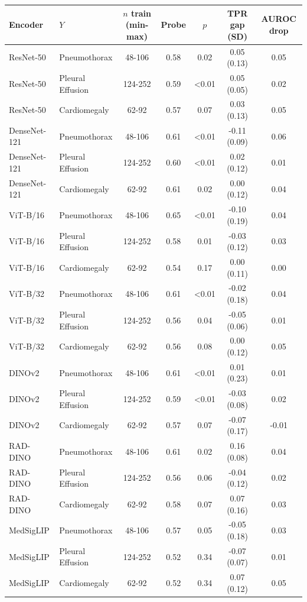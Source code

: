 \begin{tabular}{llccccc}
\toprule
Encoder & $Y$ & $n$ train (min-max) & Probe & $p$ & TPR gap (SD) & AUROC drop \\
\midrule
ResNet-50 & Pneumothorax & 48-106 & 0.58 & 0.02 & 0.05 (0.13) & 0.05 \\
ResNet-50 & Pleural Effusion & 124-252 & 0.59 & <0.01 & 0.05 (0.05) & 0.02 \\
ResNet-50 & Cardiomegaly & 62-92 & 0.57 & 0.07 & 0.03 (0.13) & 0.05 \\
DenseNet-121 & Pneumothorax & 48-106 & 0.61 & <0.01 & -0.11 (0.09) & 0.06 \\
DenseNet-121 & Pleural Effusion & 124-252 & 0.60 & <0.01 & 0.02 (0.12) & 0.01 \\
DenseNet-121 & Cardiomegaly & 62-92 & 0.61 & 0.02 & 0.00 (0.12) & 0.04 \\
ViT-B/16 & Pneumothorax & 48-106 & 0.65 & <0.01 & -0.10 (0.19) & 0.04 \\
ViT-B/16 & Pleural Effusion & 124-252 & 0.58 & 0.01 & -0.03 (0.12) & 0.03 \\
ViT-B/16 & Cardiomegaly & 62-92 & 0.54 & 0.17 & 0.00 (0.11) & 0.00 \\
ViT-B/32 & Pneumothorax & 48-106 & 0.61 & <0.01 & -0.02 (0.18) & 0.04 \\
ViT-B/32 & Pleural Effusion & 124-252 & 0.56 & 0.04 & -0.05 (0.06) & 0.01 \\
ViT-B/32 & Cardiomegaly & 62-92 & 0.56 & 0.08 & 0.00 (0.12) & 0.05 \\
DINOv2 & Pneumothorax & 48-106 & 0.61 & <0.01 & 0.01 (0.23) & 0.01 \\
DINOv2 & Pleural Effusion & 124-252 & 0.59 & <0.01 & -0.03 (0.08) & 0.02 \\
DINOv2 & Cardiomegaly & 62-92 & 0.57 & 0.07 & -0.07 (0.17) & -0.01 \\
RAD-DINO & Pneumothorax & 48-106 & 0.61 & 0.02 & 0.16 (0.08) & 0.04 \\
RAD-DINO & Pleural Effusion & 124-252 & 0.56 & 0.06 & -0.04 (0.12) & 0.02 \\
RAD-DINO & Cardiomegaly & 62-92 & 0.58 & 0.07 & 0.07 (0.16) & 0.03 \\
MedSigLIP & Pneumothorax & 48-106 & 0.57 & 0.05 & -0.05 (0.18) & 0.03 \\
MedSigLIP & Pleural Effusion & 124-252 & 0.52 & 0.34 & -0.07 (0.07) & 0.01 \\
MedSigLIP & Cardiomegaly & 62-92 & 0.52 & 0.34 & 0.07 (0.12) & 0.05 \\
\bottomrule
\end{tabular}
